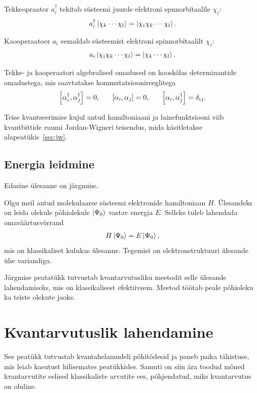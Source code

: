 \documentclass[12pt]{report}
\def\sparen#1{\left[#1\right]}
\def\ket#1{\mathinner{|#1\rangle}}
\begin{document}
Tekkeopraator \(a_i^\dagger\) tekitab süsteemi juurde elektroni spnnorbitaalile \(\chi_i\):
\begin{align}
    a_i^\dagger \ket{\chi_k \cdots \chi_l} = \ket{\chi_i \chi_k \cdots \chi_l} \rlap{.}
\end{align}

Kaooperaatoer \(a_i\) eemaldab süsteemist elektroni spinnorbitaalilt \(\chi_i\):
\begin{align}
    a_i \ket{\chi_i \chi_k \cdots \chi_l} = \ket{\chi_k \cdots \chi_l}\rlap{.}
\end{align}

Tekke- ja kaoperaatori algebralised omadused on kooskõlas determinantide omadustega, mis saavtatakse kommutatsioonireeglitega
\begin{align}
    \sparen{\alpha_i^\dagger, \alpha_j^\dagger} = 0 \rlap{,}
    \qquad \sparen{\alpha_i, \alpha_j} = 0 \rlap{,}
    \qquad \sparen{\alpha_i, \alpha_j^\dagger} = \delta_{ij} \rlap{.}
\end{align}

Teise kvantseerimise kujul antud hamiltoniaani ja lainefunktsiooni viib kvantbittide ruumi Jordan-Wigneri teisendus, mida käsitletakse alapeatükis~\ref{sec:jw}.

\section{Energia leidmine}

Edasine ülesanne on järgmine.

Olgu meil antud molekulaarse süsteemi elektronide hamiltoniaan \(H\).
Ülesandeks on leida olekule pòhiolekule \(\ket{\Psi_0}\) vastav energia \(E\).
Selleks tuleb lahendada omaväärtusvõrrand
\begin{align}
    H \ket{\Psi_0} = E \ket{\Psi_0} \rlap{,}
\end{align}
mis on klassikaliset kulukas ülesanne.
Tegemist on elektronstruktuuri ülesande ühe variandiga.

Järgmise peatatükk tutvustab kvantarvutusliku meetodit selle ülesande lahendamiseks, mis on klassikalisest efektiivsem.
Meetod töötab peale põhioleku ka teiste olekute jaoks.

\chapter{Kvantarvutuslik lahendamine}\label{chap:qcomp}

See peatükk tutvustab kvantahelamudeli põhitõdesid ja paneb paika tähistuse,
mis leiab kasutust hilisemates peatükkides. Samuti on siin ära toodud mõned
kvantarvutite eelised klassikaliste arvutite ees, põhjendatud, miks
kvantarvutus on oluline.
\end{document}
